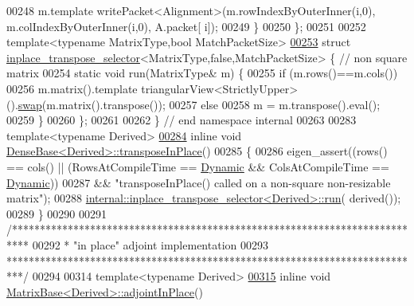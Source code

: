 \begin{DoxyCode}
00248       m.template writePacket<Alignment>(m.rowIndexByOuterInner(i,0), m.colIndexByOuterInner(i,0), A.packet[
      i]);
00249   \}
00250 \};
00251 
00252 \textcolor{keyword}{template}<\textcolor{keyword}{typename} MatrixType,\textcolor{keywordtype}{bool} MatchPacketSize>
\hyperlink{struct_eigen_1_1internal_1_1inplace__transpose__selector_3_01_matrix_type_00_01false_00_01_match_packet_size_01_4}{00253} \textcolor{keyword}{struct }\hyperlink{struct_eigen_1_1internal_1_1inplace__transpose__selector}{inplace\_transpose\_selector}<MatrixType,false,MatchPacketSize> \{ \textcolor{comment}{// non
       square matrix}
00254   \textcolor{keyword}{static} \textcolor{keywordtype}{void} run(MatrixType& m) \{
00255     \textcolor{keywordflow}{if} (m.rows()==m.cols())
00256       m.matrix().template triangularView<StrictlyUpper>().\hyperlink{endian_8c_a3ca5ecd34b04d6a243c054ac3a57f68d}{swap}(m.matrix().transpose());
00257     \textcolor{keywordflow}{else}
00258       m = m.transpose().eval();
00259   \}
00260 \};
00261 
00262 \} \textcolor{comment}{// end namespace internal}
00263 
00283 \textcolor{keyword}{template}<\textcolor{keyword}{typename} Derived>
\hyperlink{group___core___module_ac501bd942994af7a95d95bee7a16ad2a}{00284} \textcolor{keyword}{inline} \textcolor{keywordtype}{void} \hyperlink{group___core___module_ac501bd942994af7a95d95bee7a16ad2a}{DenseBase<Derived>::transposeInPlace}()
00285 \{
00286   eigen\_assert((rows() == cols() || (RowsAtCompileTime == \hyperlink{namespace_eigen_ad81fa7195215a0ce30017dfac309f0b2}{Dynamic} && ColsAtCompileTime == 
      \hyperlink{namespace_eigen_ad81fa7195215a0ce30017dfac309f0b2}{Dynamic}))
00287                && \textcolor{stringliteral}{"transposeInPlace() called on a non-square non-resizable matrix"});
00288   \hyperlink{struct_eigen_1_1internal_1_1inplace__transpose__selector}{internal::inplace\_transpose\_selector<Derived>::run}(
      derived());
00289 \}
00290 
00291 \textcolor{comment}{/***************************************************************************}
00292 \textcolor{comment}{* "in place" adjoint implementation}
00293 \textcolor{comment}{***************************************************************************/}
00294 
00314 \textcolor{keyword}{template}<\textcolor{keyword}{typename} Derived>
\hyperlink{group___core___module_a51c5982c1f64e45a939515b701fa6f4a}{00315} \textcolor{keyword}{inline} \textcolor{keywordtype}{void} \hyperlink{group___core___module_a51c5982c1f64e45a939515b701fa6f4a}{MatrixBase<Derived>::adjointInPlace}()

\end{DoxyCode}
